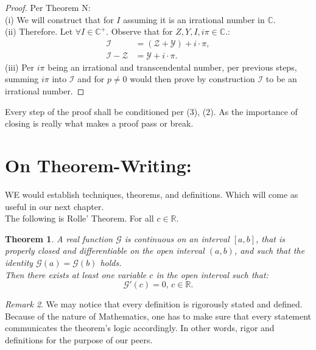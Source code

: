 \documentclass[10pt]{article}
\theoremstyle{plain}
\newtheorem{theorem}{Theorem}[section]
\theoremstyle{definition}
\theoremstyle{remark}
\newtheorem{remark}[theorem]{Remark}
\begin{document}
\begin{proof}
	Per Theorem N:\\
	(i) We will construct that for $I$ assuming it is an irrational number in $\mathbb{C}$.\\
	(ii) Therefore. Let $\forall I \in \mathbb{C}^{+}.$ Observe that for $Z, Y, I, i\pi \in \mathbb{C}.$:
	\begin{align*}
		\mathcal{I} &= (\mathcal{Z}+\mathcal{Y})+i \cdot \pi,\\
		\mathcal{I}-\mathcal{Z} &= \mathcal{Y}+i \cdot \pi.
	\end{align*}
	(iii) Per $i\pi$ being an irrational and transcendental number, per previous steps, summing $i\pi$ into $\mathcal{I}$ and for $p \neq 0$ would then prove by construction $\mathcal{I}$ to be an irrational number.
\end{proof}
Every step of the proof shall be conditioned per (3), (2). As the importance of closing is really what makes a proof pass or break.

\section{On Theorem-Writing:}

\lettrine[lines=2, lhang=0.1, loversize=0.2]{W}E would establish techniques, theorems, and definitions. Which will come as useful in our next chapter.\\
The following is Rolle' Theorem. For all $c \in \mathbb{R}.$

\begin{theorem}
	A real function $\mathcal{G}$ is continuous on an interval $[a, b]$, that is properly closed and differentiable on the open interval $(a, b)$, and such that the identity $\mathcal{G}(a) = \mathcal{G}(b)$ holds.\\Then there exists at least one variable $c$ in the open interval such that:
	\begin{equation}
		\mathcal{G}'(c) = 0, \, c \in \mathbb{R}.
	\end{equation}
\end{theorem}

\begin{remark}
We may notice that every definition is rigorously stated and defined. Because of the nature of Mathematics, one has to make sure that every statement communicates the theorem's logic accordingly. In other words, rigor and definitions for the purpose of our peers.
\end{remark}
\end{document}
